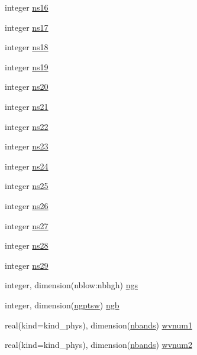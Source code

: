 \begin{DoxyCompactItemize}
\item 
integer \hyperlink{namespacemodule__radsw__parameters_a3e6e310ecc531e2d0db52864468dc4a7}{ns16}
\item 
integer \hyperlink{namespacemodule__radsw__parameters_a08303e69e406f6bb2af252b1b7dff272}{ns17}
\item 
integer \hyperlink{namespacemodule__radsw__parameters_a142f7aa9f12272d721cfeae2855eec49}{ns18}
\item 
integer \hyperlink{namespacemodule__radsw__parameters_ab666e8da69b308ae5b09e187b8153518}{ns19}
\item 
integer \hyperlink{namespacemodule__radsw__parameters_ad63ddbb0abcaeda56220a624a62a7336}{ns20}
\item 
integer \hyperlink{namespacemodule__radsw__parameters_a63b1d13965acda2c131123f67fe456ea}{ns21}
\item 
integer \hyperlink{namespacemodule__radsw__parameters_a194fffaa7b04c97d8133a9e5686e94d5}{ns22}
\item 
integer \hyperlink{namespacemodule__radsw__parameters_a547ab92fedb3e35198b384f0337a752c}{ns23}
\item 
integer \hyperlink{namespacemodule__radsw__parameters_a3cdaa790f548b6407ba586a824c5edc6}{ns24}
\item 
integer \hyperlink{namespacemodule__radsw__parameters_abaf12fd8281745e299a942530cef1a97}{ns25}
\item 
integer \hyperlink{namespacemodule__radsw__parameters_a3cf6dd031ffa5545db46bb1b54fe42b6}{ns26}
\item 
integer \hyperlink{namespacemodule__radsw__parameters_a801c6d2223877ddf3f633dc7ffcd528b}{ns27}
\item 
integer \hyperlink{namespacemodule__radsw__parameters_ac2b720c6b0ab80759cfe83aa53fb4540}{ns28}
\item 
integer \hyperlink{namespacemodule__radsw__parameters_ae966fc99ad683e9e0ee30f792db413fc}{ns29}
\item 
integer, dimension(nblow\+:nbhgh) \hyperlink{namespacemodule__radsw__parameters_a715ab3195493dff0639da443c21e4fb5}{ngs}
\item 
integer, dimension(\hyperlink{namespacemodule__radsw__parameters_adc3e4d5a848d50e2883e05c62f61bc97}{ngptsw}) \hyperlink{namespacemodule__radsw__parameters_afdd8496d7eaa017f7f1e08e998945c1e}{ngb}
\item 
real(kind=kind\+\_\+phys), dimension(\hyperlink{namespacemodule__radsw__parameters_a8f97b7698e8e5e2aec6e463fd09255cc}{nbands}) \hyperlink{namespacemodule__radsw__parameters_adc7827bd2bed6502a0a60b40b8f1deeb}{wvnum1}
\item 
real(kind=kind\+\_\+phys), dimension(\hyperlink{namespacemodule__radsw__parameters_a8f97b7698e8e5e2aec6e463fd09255cc}{nbands}) \hyperlink{namespacemodule__radsw__parameters_a88594ac7d3fbf13f2fdbac4b3b844d88}{wvnum2}
\end{DoxyCompactItemize}


